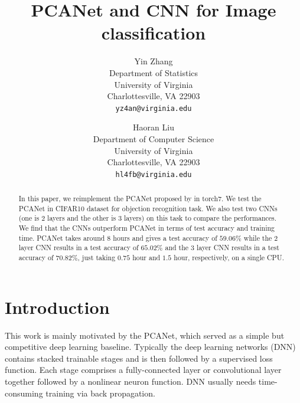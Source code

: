 \documentclass[10pt,twocolumn,letterpaper]{article}
\begin{document}
\title{PCANet and CNN for Image classification}

\author{Yin Zhang\\
Department of Statistics\\
University of Virginia\\
Charlottesville, VA 22903\\
{\tt\small yz4an@virginia.edu}
\and
Haoran Liu \\
Department of Computer Science \\
University of Virginia\\
Charlottesville, VA 22903  \\
{\tt\small hl4fb@virginia.edu} 
}

\renewcommand{\b}[1] {\boldsymbol{#1}} 
\newcommand{\bb}[1] {\bar{\boldsymbol{#1}}}

\maketitle

\begin{abstract}
In this paper, we reimplement the PCANet proposed by \cite{chan2015pcanet} in torch7. We test the PCANet in CIFAR10 dataset for objection recognition task. We also test two CNNs (one is 2 layers and the other is 3 layers) on this task to compare the performances. We find that the CNNs outperform PCANet in terms of test accuracy and training time. PCANet takes around $8$ hours and gives a test accuracy of $59.06\%$ while the 2 layer CNN results in a test accuracy of $65.02\%$ and the 3 layer CNN results in a test accuracy of $70.82\%$, just taking $0.75$ hour and $1.5$ hour, respectively, on a single CPU.  
\end{abstract}

\section{Introduction}
This work is mainly motivated by the PCANet, which served as a simple but competitive deep learning baseline. Typically the deep learning networks (DNN) contains stacked trainable stages and is then followed by a supervised loss function. Each stage comprises a fully-connected layer or convolutional layer together followed by a nonlinear neuron function. DNN usually needs time-consuming training via back propagation.
\end{document}
